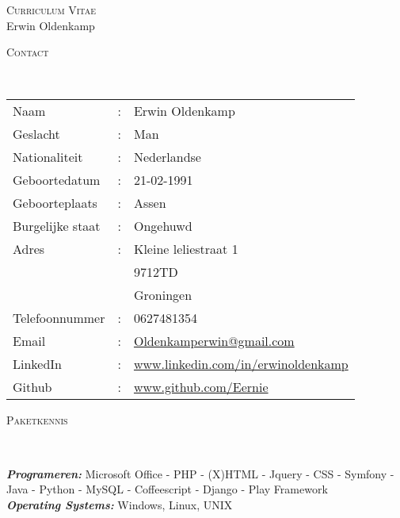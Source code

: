 \documentclass[9pt]{article}
\newenvironment{changemargin}[2]{%
  \begin{list}{}{%
    \setlength{\topsep}{0pt}%
    \setlength{\leftmargin}{#1}%
    \setlength{\rightmargin}{#2}%
    \setlength{\listparindent}{\parindent}%
    \setlength{\itemindent}{\parindent}%
    \setlength{\parsep}{\parskip}%
  }%
  \item[]}{\end{list}
}
\newcommand{\lineover}{
	\begin{changemargin}{-0.05in}{-0.05in}
		\vspace*{-8pt}
		\hrulefill \\
		\vspace*{-2pt}
	\end{changemargin}
}
\newcommand{\header}[1]{
	\begin{changemargin}{-0.5in}{-0.5in}
		\scshape{#1}\\
  	\lineover
	\end{changemargin}
}
\newcommand{\PageHead}[2]{
	\begin{changemargin}{-0.5in}{-0.5in}
		\begin{center}
			{\Large \scshape {#1}}\\ \smallskip
			{\Large {#2}}
		\end{center}
	\end{changemargin}
}
\newenvironment{body} {
	\vspace*{-16pt}
	\begin{changemargin}{-0.25in}{-0.5in}
  }	
	{\end{changemargin}
}
\begin{document}
\PageHead{Curriculum Vitae}{Erwin Oldenkamp}


\header{Contact}

\begin{body}
	\vspace{14pt}
	\begin{tabular}{l l l}
		Naam&:&Erwin Oldenkamp \\
		Geslacht&:&Man  \\
		Nationaliteit&:&Nederlandse \\
		Geboortedatum&:&21-02-1991 \\
		Geboorteplaats&:&Assen \\
		Burgelijke staat&:&Ongehuwd \\
		Adres&:&Kleine leliestraat 1 \\ 
		& & 9712TD \\ 
   		& & Groningen \\ 
		Telefoonnummer & : & 0627481354 \\
		Email &:&  \href{mailto:oldenkamperwin@gmail.com}{Oldenkamperwin@gmail.com}\\
		LinkedIn & : & \href{http://www.linkedin.com/in/erwinoldenkamp}{www.linkedin.com/in/erwinoldenkamp} \\
		Github & : & \href{http://www.github.com/Eernie}{www.github.com/Eernie} \\
	\end{tabular}
\end{body}

\smallskip

\header{Paketkennis}

\begin{body}
	\vspace{14pt}
	\emph{\textbf{Programeren:}}{} Microsoft Office - PHP - (X)HTML - Jquery - CSS - Symfony - Java - Python - MySQL - Coffeescript - Django - Play Framework \\
	\medskip
	\emph{\textbf{Operating Systems:}}{} Windows, Linux, UNIX\\
\end{body}
\end{document}
